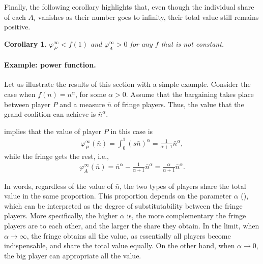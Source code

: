 \documentclass[a4paper]{article}
\newtheorem{corollary}{Corollary}
\begin{document}
Finally, the following corollary highlights that, even though the individual share of each $A_i$ vanishes as their number goes to infinity, their total value still remains positive.
\begin{corollary}
    \label{cor:fringe_value_2}
    $\varphi_P^\infty < f(1)$ and $\varphi_A^\infty > 0$ for any $f$ that is not constant.
\end{corollary}


\paragraph{Example: power function.}
\label{sec:power_function_example}

Let us illustrate the results of this section with a simple example.
Consider the case when $f(n) = n^\alpha$, for some $\alpha > 0$.
Assume that the bargaining takes place between player $P$ and a measure $\bar{n}$ of fringe players.
Thus, the value that the grand coalition can achieve is $\bar{n}^\alpha$.

 implies that the value of player $P$ in this case is
\begin{align*}
    \varphi_P^\infty(\bar{n}) = \int_0^1 (s \bar{n})^\alpha = \frac{1}{\alpha + 1} \bar{n}^\alpha,
\end{align*}
while the fringe gets the rest, i.e.,
\begin{align*}
    \varphi_A^\infty(\bar{n}) = \bar{n}^\alpha - \frac{1}{\alpha + 1} \bar{n}^\alpha = \frac{\alpha}{\alpha + 1} \bar{n}^\alpha.
\end{align*}

In words, regardless of the value of $\bar{n}$, the two types of players share the total value in the same proportion.
This proportion depends on the parameter $\alpha$ (), which can be interpreted as the degree of substitutability between the fringe players.
More specifically, the higher $\alpha$ is, the more complementary the fringe players are to each other, and the larger the share they obtain.
In the limit, when $\alpha \to \infty$, the fringe obtains all the value, as essentially all players become indispensable, and share the total value equally.
On the other hand, when $\alpha \to 0$, the big player can appropriate all the value.
\end{document}
